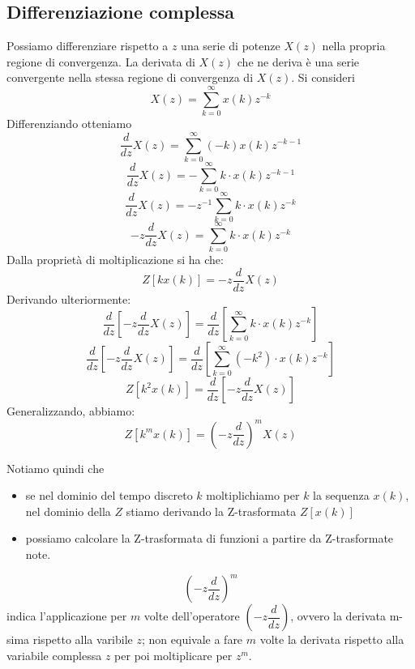 \documentclass[a4paper]{report}
\begin{document}
\subsection{Differenziazione complessa}\label{DifferenziazioneComplessa}
Possiamo differenziare rispetto a $z$ una serie di potenze $X(z)$
nella propria regione di convergenza. La derivata di $X(z)$ che ne
deriva \`e una serie convergente nella stessa regione di convergenza
di $X(z)$. Si consideri
\[
X(z) = \sum_{k=0}^{\infty}x(k)z^{-k}
\]
Differenziando otteniamo
\[
\dfrac{d}{dz}X(z) = \sum_{k=0}^{\infty} (-k) x(k) z^{-k-1}
\]
\[
\dfrac{d}{dz}X(z) = -\sum_{k=0}^{\infty} k \cdot x(k) z^{-k-1}
\]
\[
\dfrac{d}{dz}X(z) = -z^{-1}\sum_{k=0}^{\infty} k \cdot x(k) z^{-k}
\]
\[
-z\dfrac{d}{dz}X(z) = \sum_{k=0}^{\infty} k \cdot x(k) z^{-k}
\]
Dalla propriet\`a di moltiplicazione si ha che:
\[
Z[kx(k)] = -z\dfrac{d}{dz} X(z)
\]
Derivando ulteriormente:
\[
\dfrac{d}{dz}\left[-z\dfrac{d}{dz}X(z)\right]=
\dfrac{d}{dz}\left[\sum_{k=0}^{\infty} k \cdot x(k) z^{-k}\right] 
\]
\[
\dfrac{d}{dz}\left[-z\dfrac{d}{dz}X(z)\right]=
\dfrac{d}{dz}\left[\sum_{k=0}^{\infty} (-k^2) \cdot x(k) z^{-k}\right] 
\]
\[
Z[k^2 x(k)] = \dfrac{d}{dz}\left[-z\dfrac{d}{dz}X(z)\right]
\]
Generalizzando, abbiamo:
\[
Z[k^m x(k)] = \left ( -z \dfrac{d}{dz} \right )^m X(z)
\]

Notiamo quindi che
\begin{itemize}
\item se nel dominio del tempo discreto $k$ moltiplichiamo per $k$ la
  sequenza $x(k)$, nel dominio della $Z$ stiamo derivando la
  Z-trasformata $Z[x(k)]$
\item possiamo calcolare la Z-trasformata di funzioni a partire da
  Z-trasformate note.
\end{itemize}
\[
\left ( -z \dfrac{d}{dz} \right )^m 
\]
indica l'applicazione per $m$ volte dell'operatore $\left ( -z
\dfrac{d}{dz} \right )$, ovvero la derivata \mbox{m-sima} rispetto alla
varibile $z$; non equivale a fare $m$ volte la derivata rispetto alla
variabile complessa $z$ per poi moltiplicare per $z^m$.
\end{document}
